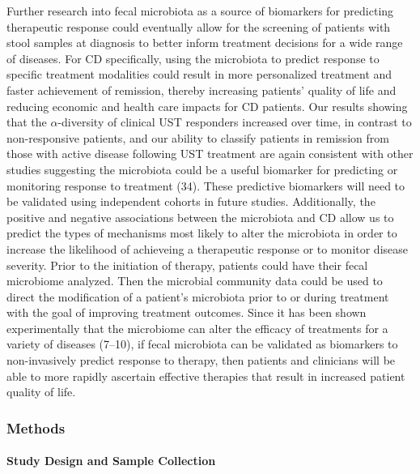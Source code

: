 \documentclass[12pt,]{article}
\let\oldparagraph\paragraph
\renewcommand{\paragraph}[1]{\oldparagraph{#1}\mbox{}}
\begin{document}
Further research into fecal microbiota as a source of biomarkers for
predicting therapeutic response could eventually allow for the screening
of patients with stool samples at diagnosis to better inform treatment
decisions for a wide range of diseases. For CD specifically, using the
microbiota to predict response to specific treatment modalities could
result in more personalized treatment and faster achievement of
remission, thereby increasing patients' quality of life and reducing
economic and health care impacts for CD patients. Our results showing
that the \({\alpha}\)-diversity of clinical UST responders increased
over time, in contrast to non-responsive patients, and our ability to
classify patients in remission from those with active disease following
UST treatment are again consistent with other studies suggesting the
microbiota could be a useful biomarker for predicting or monitoring
response to treatment (34). These predictive biomarkers will need to be
validated using independent cohorts in future studies. Additionally, the
positive and negative associations between the microbiota and CD allow
us to predict the types of mechanisms most likely to alter the
microbiota in order to increase the likelihood of achieveing a
therapeutic response or to monitor disease severity. Prior to the
initiation of therapy, patients could have their fecal microbiome
analyzed. Then the microbial community data could be used to direct the
modification of a patient's microbiota prior to or during treatment with
the goal of improving treatment outcomes. Since it has been shown
experimentally that the microbiome can alter the efficacy of treatments
for a variety of diseases (7--10), if fecal microbiota can be validated
as biomarkers to non-invasively predict response to therapy, then
patients and clinicians will be able to more rapidly ascertain effective
therapies that result in increased patient quality of life.

\newpage

\subsubsection{Methods}\label{methods}

\paragraph{Study Design and Sample
Collection}\label{study-design-and-sample-collection}
\end{document}
